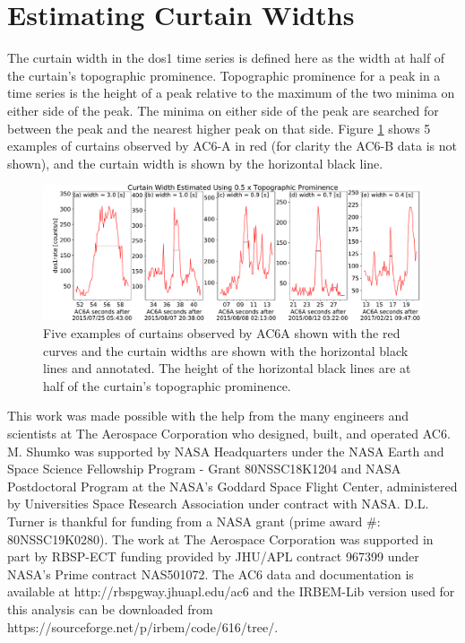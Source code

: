 \documentclass[draft]{agujournal2019}
\begin{document}
\section{Estimating Curtain Widths} \label{appendix_b}
The curtain width in the dos1 time series is defined here as the width at half of the curtain's topographic prominence. Topographic prominence for a peak in a time series is the height of a peak relative to the maximum of the two minima on either side of the peak. The minima on either side of the peak are searched for between the peak and the nearest higher peak on that side. Figure \ref{a_topographic_prominence} shows 5 examples of curtains observed by AC6-A in red (for clarity the AC6-B data is not shown), and the curtain width is shown by the horizontal black line.

\begin{figure}
\includegraphics[width=\textwidth]{a_topographic_prominence.pdf}
\caption{Five examples of curtains observed by AC6A shown with the red curves and the curtain widths are shown with the horizontal black lines and annotated. The height of the horizontal black lines are at half of the curtain's topographic prominence.}
\label{a_topographic_prominence}
\end{figure}

\acknowledgments
This work was made possible with the help from the many engineers and scientists at The Aerospace Corporation who designed, built, and operated AC6. M. Shumko was supported by NASA Headquarters under the NASA Earth and Space Science Fellowship Program - Grant 80NSSC18K1204 and NASA Postdoctoral Program at the NASA's Goddard Space Flight Center, administered by Universities Space Research Association under contract with NASA. D.L. Turner is thankful for funding from a NASA grant (prime award \#: 80NSSC19K0280). The work at The Aerospace Corporation was supported in part by RBSP-ECT funding provided by JHU/APL contract 967399 under NASA's Prime contract NAS501072. The AC6 data and documentation is available at http://rbspgway.jhuapl.edu/ac6 and the IRBEM-Lib version used for this analysis can be downloaded from \\ https://sourceforge.net/p/irbem/code/616/tree/.


%
\end{document}
